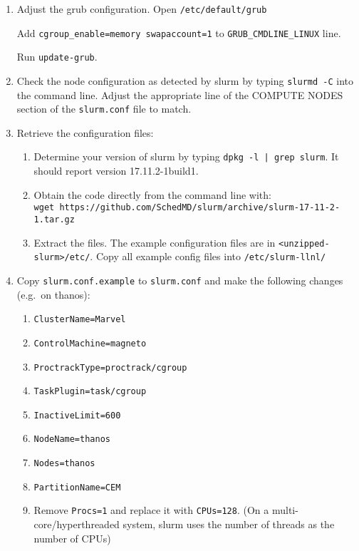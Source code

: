 \begin{enumerate}
\begin{enumerate}
	\item Adjust the grub configuration. Open \texttt{/etc/default/grub} 
	
	Add \texttt{cgroup\_enable=memory swapaccount=1} to  \texttt{GRUB\_CMDLINE\_LINUX} line.
	
	Run \texttt{update-grub}.

	\item Check the node configuration as detected by slurm by typing \texttt{slurmd -C} into the command line. Adjust the appropriate line of the COMPUTE NODES section of the \texttt{slurm.conf} file to match.

	\item Retrieve the configuration files:

		\begin{enumerate}
		\item Determine your version of slurm by typing \texttt{dpkg -l | grep slurm}. It should report version 17.11.2-1build1. 
	
		\item Obtain the code directly from the command line with: \\ 
	\texttt{wget https://github.com/SchedMD/slurm/archive/slurm-17-11-2-1.tar.gz}
	 
		\item Extract the files. The example configuration files are in \texttt{<unzipped-slurm>/etc/}. Copy all example config files into \texttt{/etc/slurm-llnl/}
	\end{enumerate}

	\item Copy \texttt{slurm.conf.example} to \texttt{slurm.conf} and make the following changes (e.g.\ on thanos):

		\begin{enumerate}
		\item \texttt{ClusterName=Marvel}
		\item \texttt{ControlMachine=magneto}
		\item \texttt{ProctrackType=proctrack/cgroup}	
		\item \texttt{TaskPlugin=task/cgroup}
		\item \texttt{InactiveLimit=600}	
		\item \texttt{NodeName=thanos}
		\item \texttt{Nodes=thanos}
		\item \texttt{PartitionName=CEM}

		\item Remove \texttt{Procs=1} and replace it with \texttt{CPUs=128}. (On a multi-core/hyperthreaded system, slurm uses the number of threads as the number of CPUs)


\end{enumerate}
\end{enumerate}
\end{enumerate}
